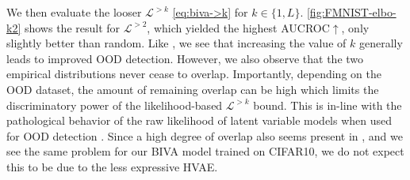 We then evaluate the looser $\mathcal{L}^{>k}$ \eqref{eq:biva->k} for $k\in\{1,L\}$.
\cref{fig:FMNIST-elbo-k2} shows the result for $\mathcal{L}^{>2}$, which yielded the highest AUCROC$\uparrow$, only slightly better than random.
Like \textcite{maaloe_biva_2019}, we see that increasing the value of $k$ generally leads to improved OOD detection.
However, we also observe that the two empirical distributions never cease to overlap.
Importantly, depending on the OOD dataset, the amount of remaining overlap can be high which limits the discriminatory power of the likelihood-based $\mathcal{L}^{>k}$ bound.
This is in-line with the pathological behavior of the raw likelihood of latent variable models when used for OOD detection \cite{xiao_likelihood_2020}.
Since a high degree of overlap also seems present in \textcite{maaloe_biva_2019}, and we see the same problem for our BIVA model trained on CIFAR10, we do not expect this to be due to the less expressive HVAE.



